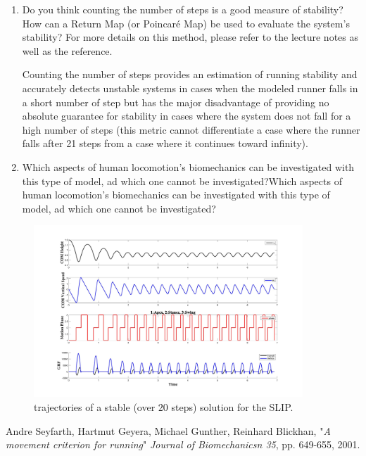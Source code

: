 \documentclass[11pt]{article}
\begin{document}
\begin{enumerate}
    \item Do you think counting the number of steps is a good measure of stability? How can a Return Map (or Poincaré Map) be used to evaluate the system's stability? For more details on this method, please refer to the lecture notes as well as the reference.
    \begin{adjustwidth}{0.5cm}{}
        Counting the number of steps provides an estimation of running stability and accurately detects unstable systems in cases when the modeled runner falls in a short number of step but has the major disadvantage of providing no absolute guarantee for stability in cases where the system does not fall for a high number of steps (this metric cannot differentiate a case where the runner falls after 21 steps from a case where it continues toward infinity). 
    \end{adjustwidth}

    \item Which aspects of human locomotion's biomechanics can be investigated with this type of model, ad which one cannot be investigated?Which aspects of human locomotion's biomechanics can be investigated with this type of model, ad which one cannot be investigated?
    \begin{adjustwidth}{0.5cm}{}
        
    \end{adjustwidth}
\end{enumerate}

\begin{figure}[h!]
    \centering
    \includegraphics[width=0.9\textwidth]{screens/run_1.jpg}
    \caption{trajectories of a stable (over $20$ steps) solution for the SLIP.}
\end{figure}

\begin{thebibliography}{1}

     Andre Seyfarth, Hartmut Geyera, Michael Gunther, Reinhard Blickhan, "\textit{A movement criterion for running}" \emph{Journal of Biomechanicsn 35}, pp. 649-655, 2001.

\end{thebibliography}
\end{document}
